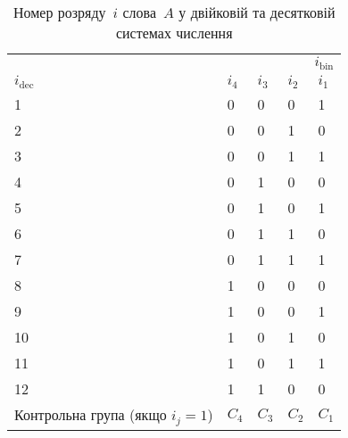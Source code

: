 \documentclass[
	a4paper,
	oneside,
	BCOR = 10mm,
	DIV = 12,
	12pt,
	headings = normal,
]{scrartcl}
\newlength{\gridunitwidth}
\begin{document}
			\begin{table}[!htbp]
				\centering
				\caption{Номер розряду~$i$ слова~$A$ у двійковій та десятковій системах числення}
				\label{tab:01-word-a-bit-numbers}
				\begin{tabular}{
						v{3\gridunitwidth - 2\tabcolsep}
						n{1\gridunitwidth - 2\tabcolsep}
						n{1\gridunitwidth - 2\tabcolsep}
						n{1\gridunitwidth - 2\tabcolsep}
						n{1\gridunitwidth - 2\tabcolsep}
				}
					\toprule
						 & \\
						\cmidrule(lr){2-5}
						$i_{\text{dec}}$ & $i_4$ & $i_3$ & $i_2$ & $i_1$\\
					  & 0 & 0 & 0 & 1\\
						2  & 0 & 0 & 1 & 0\\
						3  & 0 & 0 & 1 & 1\\
						4  & 0 & 1 & 0 & 0\\
						5  & 0 & 1 & 0 & 1\\
						6  & 0 & 1 & 1 & 0\\
						7  & 0 & 1 & 1 & 1\\
						8  & 1 & 0 & 0 & 0\\
						9  & 1 & 0 & 0 & 1\\
						10 & 1 & 0 & 1 & 0\\
						11 & 1 & 0 & 1 & 1\\
						12 & 1 & 1 & 0 & 0\\
					\midrule
						Контрольна група (якщо $i_j = 1$) & $C_4$ & $C_3$ & $C_2$ & $C_1$\\
					\bottomrule
				\end{tabular}
			\end{table}
\end{document}
